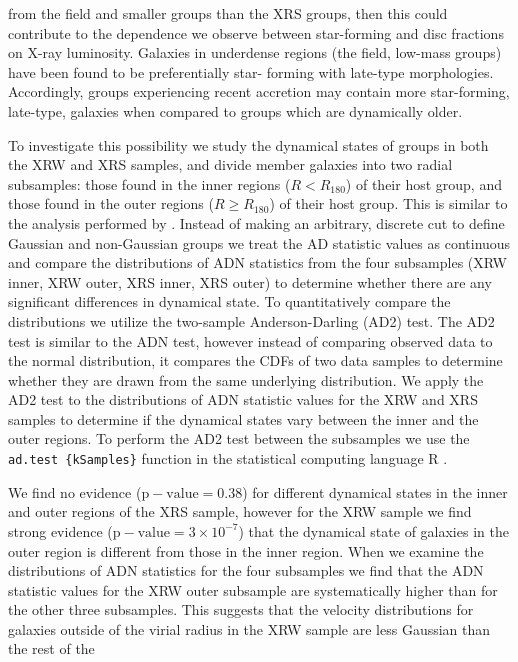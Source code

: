 from the field and smaller groups than the XRS groups, then this could
contribute to the dependence we observe between star-forming and disc
fractions on X-ray luminosity.  Galaxies in underdense regions (the
field, low-mass groups) have been found to be preferentially star-
forming with late-type morphologies.  Accordingly, groups experiencing
recent accretion may contain more star-forming, late-type, galaxies
when compared to groups which are dynamically older.
\par
To investigate this possibility we study the dynamical states of
groups in both the XRW and XRS samples, and divide member galaxies
into two radial subsamples: those found in the inner regions ($R <
R_{180}$) of their host group, and those found in the outer regions
($R \ge R_{180}$) of their host group.  This is similar to the
analysis performed by \citet{popesso2007a}.  Instead of making an
arbitrary, discrete cut to define Gaussian and non-Gaussian groups we
treat the AD statistic values as continuous and compare the
distributions of ADN statistics from the four subsamples (XRW inner,
XRW outer, XRS inner, XRS outer) to determine whether there are any
significant differences in dynamical state.  To quantitatively compare
the distributions we utilize the two-sample Anderson-Darling (AD2)
test.  The AD2 test is similar to the ADN test, however instead of
comparing observed data to the normal distribution, it compares the
CDFs of two data samples to determine whether they are drawn from the
same underlying distribution.  We apply the AD2 test to the
distributions of ADN statistic values for the XRW and XRS samples to
determine if the dynamical states vary between the inner and the outer
regions.  To perform the AD2 test between the subsamples we use the
\texttt{ad.test \{kSamples\}} function in the statistical computing
language \textsc{R} \citep{r2013}.
\par
We find no evidence ($\mathrm{p-value} = 0.38$) for different
dynamical states in the inner and outer regions of the XRS sample,
however for the XRW sample we find strong evidence ($\mathrm{p-value}
= 3 \times 10^{-7}$) that the dynamical state of galaxies in the outer
region is different from those in the inner region.  When we examine
the distributions of ADN statistics for the four subsamples we find
that the ADN statistic values for the XRW outer subsample are
systematically higher than for the other three subsamples.  This
suggests that the velocity distributions for galaxies outside of the
virial radius in the XRW sample are less Gaussian than the rest of the

